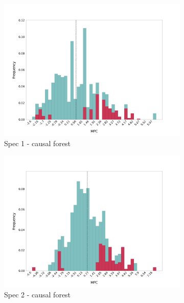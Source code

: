 \begin{figure}[t]
    \begin{subfigure}{0.33\linewidth}
        \includegraphics[width=\linewidth]{figures/distributions/spec1_cf_chTOTexp.png}
        \caption{Spec 1 - causal forest }
    \end{subfigure}\hfill
    \begin{subfigure}{0.33\linewidth}
        \includegraphics[width=\linewidth]{figures/distributions/spec2_cf_chTOTexp.png}
        \caption{Spec 2 - causal forest }
    \end{subfigure}\hfill
    \begin{subfigure}{0.33\linewidth}

\end{subfigure}
\end{figure}
